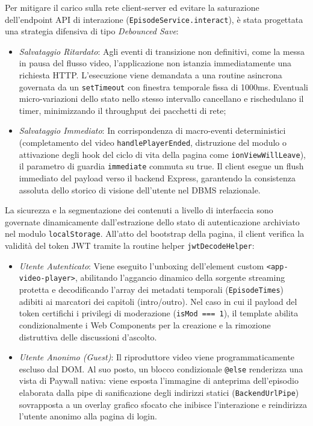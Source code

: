 \documentclass[11pt,a4paper]{article}
\begin{document}
\begin{itemize}
    Per mitigare il carico sulla rete client-server ed evitare la saturazione dell'endpoint API di interazione (\texttt{EpisodeService.interact}), è stata progettata una strategia difensiva di tipo \textit{Debounced Save}:
    \begin{itemize}
        \item \textit{Salvataggio Ritardato}: Agli eventi di transizione non definitivi, come la messa in pausa del flusso video, l'applicazione non istanzia immediatamente una richiesta HTTP. L'esecuzione viene demandata a una routine asincrona governata da un \texttt{setTimeout} con finestra temporale fissa di 1000ms. Eventuali micro-variazioni dello stato nello stesso intervallo cancellano e rischedulano il timer, minimizzando il throughput dei pacchetti di rete;
        \item \textit{Salvataggio Immediato}: In corrispondenza di macro-eventi deterministici (completamento del video \texttt{handlePlayerEnded}, distruzione del modulo o attivazione degli hook del ciclo di vita della pagina come \texttt{ionViewWillLeave}), il parametro di guardia \texttt{immediate} commuta su true. Il client esegue un flush immediato del payload verso il backend Express, garantendo la consistenza assoluta dello storico di visione dell'utente nel DBMS relazionale.
    \end{itemize}
    La sicurezza e la segmentazione dei contenuti a livello di interfaccia sono governate dinamicamente dall'estrazione dello stato di autenticazione archiviato nel modulo \texttt{localStorage}. All'atto del bootstrap della pagina, il client verifica la validità del token JWT tramite la routine helper \texttt{jwtDecodeHelper}:
    \begin{itemize}
        \item \textit{Utente Autenticato}: Viene eseguito l'unboxing dell'element custom \texttt{<app-video-player>}, abilitando l'aggancio dinamico della sorgente streaming protetta e decodificando l'array dei metadati temporali (\texttt{EpisodeTimes}) adibiti ai marcatori dei capitoli (intro/outro). Nel caso in cui il payload del token certifichi i privilegi di moderazione (\texttt{isMod === 1}), il template abilita condizionalmente i Web Components per la creazione e la rimozione distruttiva delle discussioni d'ascolto.
        \item \textit{Utente Anonimo (Guest)}: Il riproduttore video viene programmaticamente escluso dal DOM. Al suo posto, un blocco condizionale \texttt{@else} renderizza una vista di Paywall nativa: viene esposta l'immagine di anteprima dell'episodio elaborata dalla pipe di sanificazione degli indirizzi statici (\texttt{BackendUrlPipe}) sovrapposta a un overlay grafico sfocato che inibisce l'interazione e reindirizza l'utente anonimo alla pagina di login.

\end{itemize}
\end{itemize}
\end{document}
